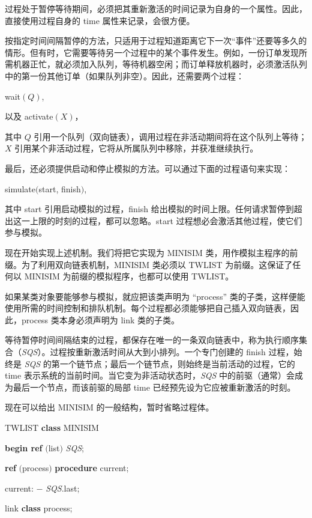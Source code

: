 过程处于暂停等待期间，必须把其重新激活的时间记录为自身的一个属性。因此，直接使用过程自身的 time 属性来记录，会很方便。

按指定时间间隔暂停的方法，只适用于过程知道距离它下一次“事件”还要等多久的情形。但有时，它需要等待另一个过程中的某个事件发生。例如，一份订单发现所需机器正忙，就必须加入队列，等待机器空闲；而订单释放机器时，必须激活队列中的第一份其他订单（如果队列非空）。因此，还需要两个过程：

\quad wait$(Q)$,

\quad 以及 activate$(X)$，

\noindent
其中 $Q$ 引用一个队列（双向链表），调用过程在非活动期间将在这个队列上等待；$X$ 引用某个非活动过程，它将从所属队列中移除，并获准继续执行。

最后，还必须提供启动和停止模拟的方法。可以通过下面的过程语句来实现：

\quad simulate$($start, finish$)$,

\noindent
其中 start 引用启动模拟的过程，finish 给出模拟的时间上限。任何请求暂停到超出这一上限的时刻的过程，都可以忽略。start 过程想必会激活其他过程，使它们参与模拟。

现在开始实现上述机制。我们将把它实现为 MINISIM 类，用作模拟主程序的前缀。为了利用双向链表机制，MINISIM 类必须以 TWLIST 为前缀。这保证了任何以 MINISIM 为前缀的模拟程序，也都可以使用 TWLIST。

如果某类对象要能够参与模拟，就应把该类声明为 ``process'' 类的子类，这样便能使用所需的时间控制和排队机制。每个过程都必须能够把自己插入双向链表，因此，process 类本身必须声明为 link 类的子类。

等待暂停时间间隔结束的过程，都保存在唯一的一条双向链表中，称为执行顺序集合（\textit{SQS}）。过程按重新激活时间从大到小排列。一个专门创建的 finish 过程，始终是 \textit{SQS} 的第一个链节点；最后一个链节点，则始终是当前活动的过程，它的 time 表示系统的当前时间。当它变为非活动状态时，\textit{SQS} 中的前驱（通常）会成为最后一个节点，而该前驱的局部 time 已经预先设为它应被重新激活的时刻。

现在可以给出 MINISIM 的一般结构，暂时省略过程体。

\quad TWLIST \textbf{class} MINISIM

\quad \textbf{begin ref} $($list$)$ \textit{SQS};

\quad \quad \textbf{ref} $($process$)$ \textbf{procedure} current;

\quad \quad \quad current: $-$ \textit{SQS}.last;

\quad \quad \quad link \textbf{class} process;

